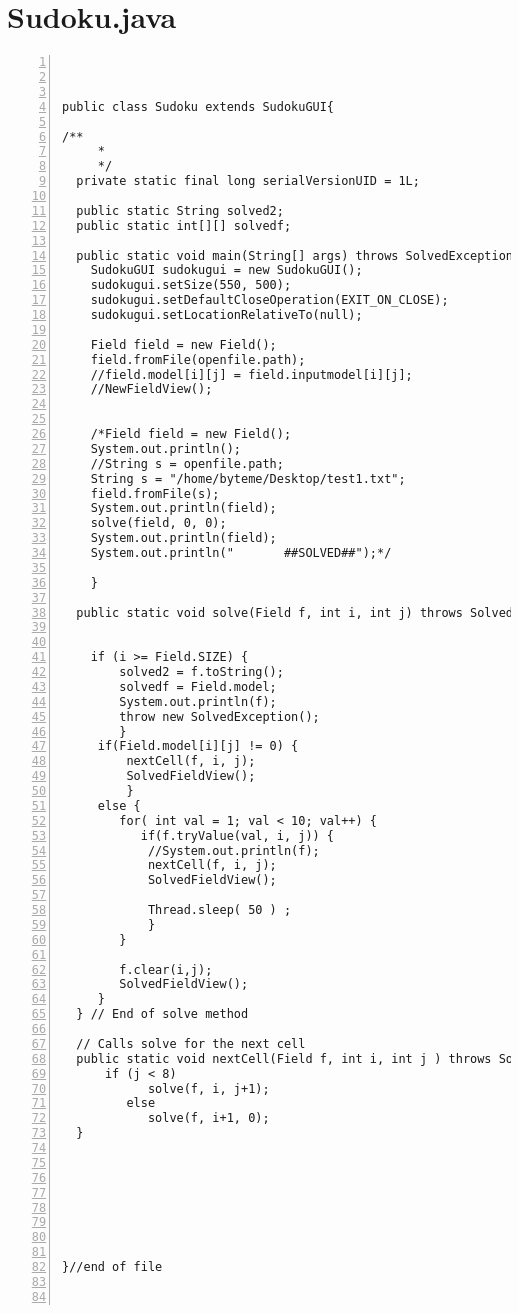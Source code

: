 \documentclass{article}
\begin{document}
\section{Sudoku.java}\label{sec:tree}
\begin{lstlisting}[language=Tex,
basicstyle=\footnotesize\ttfamily,
numbers=left,stepnumber=1, 
morekeywords={assert},
tabsize=4,
breaklines=true]



public class Sudoku extends SudokuGUI{

/**
	 * 
	 */
  private static final long serialVersionUID = 1L;
  
  public static String solved2;
  public static int[][] solvedf;
   
  public static void main(String[] args) throws SolvedException{  
	SudokuGUI sudokugui = new SudokuGUI(); 
	sudokugui.setSize(550, 500);
	sudokugui.setDefaultCloseOperation(EXIT_ON_CLOSE);
	sudokugui.setLocationRelativeTo(null);

	Field field = new Field();
	field.fromFile(openfile.path);
	//field.model[i][j] = field.inputmodel[i][j];
	//NewFieldView();
	

	/*Field field = new Field();
	System.out.println();
	//String s = openfile.path;
	String s = "/home/byteme/Desktop/test1.txt";
	field.fromFile(s);
	System.out.println(field);
	solve(field, 0, 0);
	System.out.println(field);
	System.out.println("       ##SOLVED##");*/
	
   	} 

  public static void solve(Field f, int i, int j) throws SolvedException, InterruptedException {

	   
    if (i >= Field.SIZE) {
    	solved2 = f.toString();
    	solvedf = Field.model; 
    	System.out.println(f);
        throw new SolvedException();
        }
     if(Field.model[i][j] != 0) {
    	 nextCell(f, i, j);
    	 SolvedFieldView();
    	 }     
     else {
        for( int val = 1; val < 10; val++) {
           if(f.tryValue(val, i, j)) {
        	//System.out.println(f); 
        	nextCell(f, i, j);
        	SolvedFieldView();
        	
        	Thread.sleep( 50 ) ;
        	}
        }

        f.clear(i,j);
        SolvedFieldView();
     }
  } // End of solve method   
  
  // Calls solve for the next cell 
  public static void nextCell(Field f, int i, int j ) throws SolvedException, InterruptedException {
	  if (j < 8)
        	solve(f, i, j+1);
    	 else
        	solve(f, i+1, 0);
  }


  
  
  
  
  
  
}//end of file 
  


\end{lstlisting}
\end{document}
